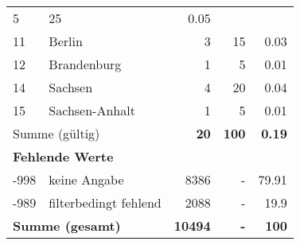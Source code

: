 \begin{longtable}{lXrrr}
       \num{5} &
       \num[round-mode=places,round-precision=2]{25} &
         \num[round-mode=places,round-precision=2]{0.05} \\

     11 &
     \multicolumn{1}{X}{ Berlin   } &


       \num{3} &
       \num[round-mode=places,round-precision=2]{15} &
         \num[round-mode=places,round-precision=2]{0.03} \\

     12 &
     \multicolumn{1}{X}{ Brandenburg   } &


       \num{1} &
       \num[round-mode=places,round-precision=2]{5} &
         \num[round-mode=places,round-precision=2]{0.01} \\

     14 &
     \multicolumn{1}{X}{ Sachsen   } &


       \num{4} &
       \num[round-mode=places,round-precision=2]{20} &
         \num[round-mode=places,round-precision=2]{0.04} \\

     15 &
     \multicolumn{1}{X}{ Sachsen-Anhalt   } &


       \num{1} &
       \num[round-mode=places,round-precision=2]{5} &
         \num[round-mode=places,round-precision=2]{0.01} \\
     \midrule
     \multicolumn{2}{l}{Summe (gültig)} &
       \textbf{\num{20}} &
     \textbf{\num{100}} &
       \textbf{\num[round-mode=places,round-precision=2]{0.19}} \\
     \multicolumn{5}{l}{\textbf{Fehlende Werte}}\\
       -998 &
       keine Angabe &
         \num{8386} &
        - &
         \num[round-mode=places,round-precision=2]{79.91} \\
       -989 &
       filterbedingt fehlend &
         \num{2088} &
        - &
         \num[round-mode=places,round-precision=2]{19.9} \\
     \midrule
     \multicolumn{2}{l}{\textbf{Summe (gesamt)}} &
          \textbf{\num{10494}} &
        \textbf{-} &
        \textbf{\num{100}} \\
     \bottomrule
     \end{longtable}
     
